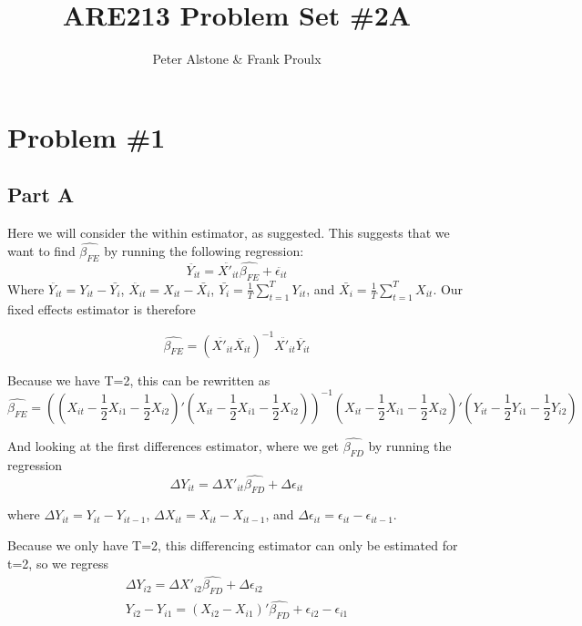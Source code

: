 \documentclass[letterpaper, 12pt]{article}
\begin{document}
\title{ARE213 Problem Set \#2A}
\author{Peter Alstone \& Frank Proulx}
\maketitle

\section{Problem \#1}
\subsection{Part A}
Here we will consider the within estimator, as suggested. This suggests that we want to find $\widehat{\beta_{FE}}$ by running the following regression:
\begin{equation}
\ddot{Y_{it}} = \ddot{X'_{it}}\widehat{\beta_{FE}} + \ddot{\epsilon_{it}}
\end{equation}
Where $\ddot{Y_{it}}=Y_{it}-\bar{Y_i}$, $\ddot{X_{it}}=X_{it}-\bar{X_i}$, $\bar{Y_i}=\frac{1}{T}\sum_{t=1}^TY_{it}$, and $\bar{X_i}=\frac{1}{T}\sum_{t=1}^TX_{it}$.
Our fixed effects estimator is therefore

\begin{equation}
\widehat{\beta_{FE}}=(\ddot{X'_{it}}\ddot{X_{it}})^{-1}\ddot{X'_{it}}\ddot{Y_{it}} %
\end{equation}

Because we have T=2, this can be rewritten as
\begin{equation}
\widehat{\beta_{FE}}=((X_{it}-\frac{1}{2}X_{i1}-\frac{1}{2}X_{i2})'(X_{it}-\frac{1}{2}X_{i1}-\frac{1}{2}X_{i2}))^{-1}(X_{it}-\frac{1}{2}X_{i1}-\frac{1}{2}X_{i2})'(Y_{it}-\frac{1}{2}Y_{i1}-\frac{1}{2}Y_{i2})
\end{equation}




And looking at the first differences estimator, where we get $\widehat{\beta_{FD}}$ by running the regression
\begin{equation}
\Delta Y_{it} = \Delta X'_{it} \widehat{\beta_{FD}} + \Delta \epsilon_{it}
\end{equation}

where $\Delta Y_{it} = Y_{it} - Y_{it-1}$, $\Delta X_{it} = X_{it} - X_{it-1}$, and $\Delta \epsilon_{it} = \epsilon_{it} - \epsilon_{it-1}$.

Because we only have T=2, this differencing estimator can only be estimated for t=2, so we regress
\begin{align}
\Delta Y_{i2} = \Delta X'_{i2} \widehat{\beta_{FD}} + \Delta \epsilon_{i2} \\
Y_{i2}-Y_{i1} = (X_{i2}-X_{i1})'\widehat{\beta_{FD}} + \epsilon_{i2}-\epsilon_{i1}
\end{align}
\end{document}
